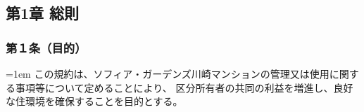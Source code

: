 \documentclass[
  twoside,
  luatex,
  paper=a4paper,
  fontsize=11pt,
  jafontsize=11pt,
  jlreq_notes,
]{jlreq}
\newcommand{\joumain}[1]{%
  \noindent\hangindent=1em\hangafter=1
  \hspace{1em}#1%
}
\begin{document}
  \begin{center}
    \subsection*{第1章 総則}
  \end{center}

  \subsubsection*{第１条（目的）}
  \joumain{この規約は、ソフィア・ガーデンズ川崎マンションの管理又は使用に関する事項等について定めることにより、
  区分所有者の共同の利益を増進し、良好な住環境を確保することを目的とする。}
\end{document}
